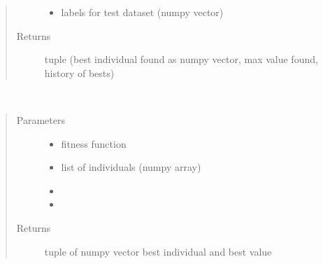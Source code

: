 \documentclass[letterpaper,10pt,english]{sphinxmanual}
\begin{document}
\begin{fulllineitems}
\begin{fulllineitems}
\begin{quote}
\begin{description}
\begin{itemize}
\item {} 
 \textendash{} labels for test dataset (numpy vector)

\end{itemize}

\item[{Returns}] \leavevmode
tuple (best individual found as numpy vector, max value found, history of bests)

\end{description}\end{quote}

\end{fulllineitems}


\begin{fulllineitems}
\label{\detokenize{index:genetic_optimizer.GeneticNeuralWeightOptimizer.best_of_generation}}~\begin{quote}\begin{description}
\item[{Parameters}] \leavevmode\begin{itemize}
\item {} 
 \textendash{} fitness function

\item {} 
 \textendash{} list of individuals (numpy array)

\item {} 
 \textendash{} 

\item {} 
 \textendash{} 

\end{itemize}

\item[{Returns}] \leavevmode
tuple of numpy vector best individual and best value

\end{description}\end{quote}

\end{fulllineitems}


\end{fulllineitems}
\end{document}
